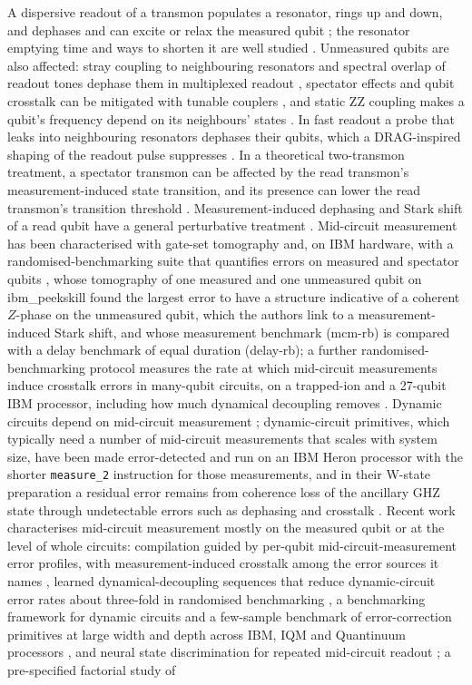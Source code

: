 \documentclass[reprint,amsmath,amssymb,aps,superscriptaddress,nofootinbib]{revtex4-2}
\begin{document}
A dispersive readout of a transmon populates a resonator, rings up and down, and dephases and can excite or relax the measured qubit \cite{Gambetta2006,Boissonneault2009,Sank2016}; the resonator emptying time and ways to shorten it are well studied \cite{McClure2016,Bultink2016,Walter2017,Swiadek2024}. Unmeasured qubits are also affected: stray coupling to neighbouring resonators and spectral overlap of readout tones dephase them in multiplexed readout \cite{Heinsoo2018}, spectator effects and qubit crosstalk can be mitigated with tunable couplers \cite{Mundada2019,Vallesa2026}, and static ZZ coupling makes a qubit's frequency depend on its neighbours' states \cite{Sundaresan2020,Kandala2021,Ketterer2023,Zhao2021}. In fast readout a probe that leaks into neighbouring resonators dephases their qubits, which a DRAG-inspired shaping of the readout pulse suppresses \cite{Gao2025}. In a theoretical two-transmon treatment, a spectator transmon can be affected by the read transmon's measurement-induced state transition, and its presence can lower the read transmon's transition threshold \cite{Hoyau2026}. Measurement-induced dephasing and Stark shift of a read qubit have a general perturbative treatment \cite{Malekakhlagh2022}. Mid-circuit measurement has been characterised with gate-set tomography \cite{Rudinger2022} and, on IBM hardware, with a randomised-benchmarking suite that quantifies errors on measured and spectator qubits \cite{Govia2023}, whose tomography of one measured and one unmeasured qubit on ibm\_peekskill found the largest error to have a structure indicative of a coherent $Z$-phase on the unmeasured qubit, which the authors link to a measurement-induced Stark shift, and whose measurement benchmark (mcm-rb) is compared with a delay benchmark of equal duration (delay-rb); a further randomised-benchmarking protocol measures the rate at which mid-circuit measurements induce crosstalk errors in many-qubit circuits, on a trapped-ion and a 27-qubit IBM processor, including how much dynamical decoupling removes \cite{Hothem2024}. Dynamic circuits depend on mid-circuit measurement \cite{Corcoles2021}; dynamic-circuit primitives, which typically need a number of mid-circuit measurements that scales with system size, have been made error-detected and run on an IBM Heron processor with the shorter \texttt{measure\_2} instruction for those measurements, and in their W-state preparation a residual error remains from coherence loss of the ancillary GHZ state through undetectable errors such as dephasing and crosstalk \cite{Smith2026}. Recent work characterises mid-circuit measurement mostly on the measured qubit or at the level of whole circuits: compilation guided by per-qubit mid-circuit-measurement error profiles, with measurement-induced crosstalk among the error sources it names \cite{Zhong2025}, learned dynamical-decoupling sequences that reduce dynamic-circuit error rates about three-fold in randomised benchmarking \cite{Tong2026}, a benchmarking framework for dynamic circuits \cite{Shirgure2026} and a few-sample benchmark of error-correction primitives at large width and depth across IBM, IQM and Quantinuum processors \cite{MontanezBarrera2026}, and neural state discrimination for repeated mid-circuit readout \cite{ZhangC2026}; a pre-specified factorial study of 
\end{document}
